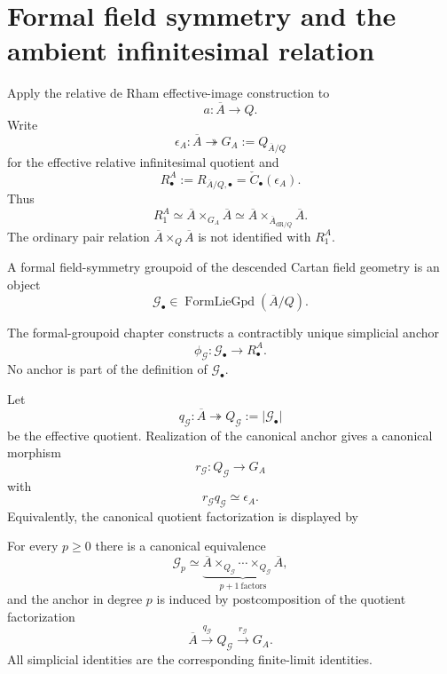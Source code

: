 \section{Formal field symmetry and the ambient infinitesimal relation}
\label{sec:symmetry-noether-formal-field-symmetry-and-the-ambient-infinitesimal-relation}

Apply the relative de Rham effective-image construction to
\[
a:\overline A\longrightarrow Q.
\]
Write
\[
\epsilon_A:
\overline A\twoheadrightarrow G_A:=Q_{\overline A/Q}
\]
for the effective relative infinitesimal quotient and
\[
R^A_\bullet:=R_{\overline A/Q,\bullet}
=
\check C_\bullet(\epsilon_A).
\]
Thus
\[
R^A_1
\simeq
\overline A\times_{G_A}\overline A
\simeq
\overline A\times_{\overline A_{\mathrm{dR}/Q}}\overline A.
\]
The ordinary pair relation
$\overline A\times_Q\overline A$ is not identified with $R^A_1$.

\begin{definition}
\label{def:symmetry-noether-formal-field-symmetry-groupoid}
A formal field-symmetry groupoid of the descended Cartan field geometry is an
object
\[
\mathcal G_\bullet\in
\operatorname{FormLieGpd}(\overline A/Q).
\]
\end{definition}

The formal-groupoid chapter constructs a contractibly unique simplicial anchor
\[
\phi_{\mathcal G}:
\mathcal G_\bullet\longrightarrow R^A_\bullet.
\]
No anchor is part of the definition of $\mathcal G_\bullet$.

\begin{definition}
\label{def:symmetry-noether-formal-symmetry-quotient}
Let
\[
q_{\mathcal G}:
\overline A\twoheadrightarrow Q_{\mathcal G}
:=
|\mathcal G_\bullet|
\]
be the effective quotient.  Realization of the canonical anchor gives a canonical
morphism
\[
r_{\mathcal G}:
Q_{\mathcal G}\longrightarrow G_A
\]
with
\[
r_{\mathcal G}q_{\mathcal G}\simeq\epsilon_A.
\]
Equivalently, the canonical quotient factorization is displayed by
\end{definition}

\begin{proposition}
\label{prop:symmetry-noether-quotient-and-relation-presentation}
For every $p\ge0$ there is a canonical equivalence
\[
\mathcal G_p
\simeq
\underbrace{
\overline A\times_{Q_{\mathcal G}}\cdots\times_{Q_{\mathcal G}}\overline A
}_{p+1\ \mathrm{factors}},
\]
and the anchor in degree $p$ is induced by postcomposition of the quotient
factorization
\[
\overline A
\xrightarrow{q_{\mathcal G}}
Q_{\mathcal G}
\xrightarrow{r_{\mathcal G}}
G_A.
\]
All simplicial identities are the corresponding finite-limit identities.
\end{proposition}

